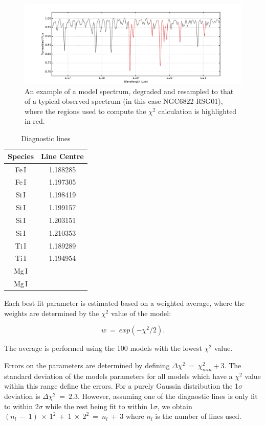 \documentclass[12pt]{article}
\begin{document}
\begin{figure}
 \centering
 \includegraphics[width=\textwidth]{Diag-lines}
 \caption[Diagnostic lines]{
An example of a model spectrum, degraded and resampled to that of a typical observed spectrum (in this case NGC6822-RSG01), where the regions used to compute the $\chi^{2}$ calculation is highlighted in red.\label{fig:lines}
         }
\end{figure}

\begin{table}
\caption[Diagnostic lines]{Diagnostic lines\label{tb:lines}}
\scriptsize
\begin{center}
\begin{tabular}{cc}
 \hline
 \hline
Species & Line Centre \\
 \hline
Fe\,I & 1.188285 \\
Fe\,I & 1.197305 \\
Si\,I & 1.198419 \\
Si\,I & 1.199157 \\
Si\,I & 1.203151 \\
Si\,I & 1.210353 \\
Ti\,I & 1.189289 \\
Ti\,I & 1.194954 \\
Mg\,I & \\
Mg\,I & \\
 \hline
\end{tabular}
\end{center}
\end{table}

Each best fit parameter is estimated based on a weighted average,
where the weights are determined by the $\chi^{2}$ value of the model:

\begin{equation}
    w~=~exp(-\chi^{2}/2).
\end{equation}

The average is performed using the 100 models with the lowest $\chi^{2}$ value.

Errors on the parameters are determined by defining
$\Delta\chi^{2}~=~\chi^{2}_{min} + 3$.
The standard deviation of the models parameters for all models which have a
$\chi^{2}$ value within this range define the errors.
For a purely Gaussin distribution the 1$\sigma$ deviation is $\Delta\chi^{2}~=~2.3$.
However, assuming one of the diagnostic lines is only fit to within 2$\sigma$ while the rest being fit to within 1$\sigma$, we obtain $(n_{l}~-~1)~\times~1^{2}~+~1~\times~2^{2}~=~n_{l}~+~3$
where $n_{l}$ is the number of lines used.
\end{document}
